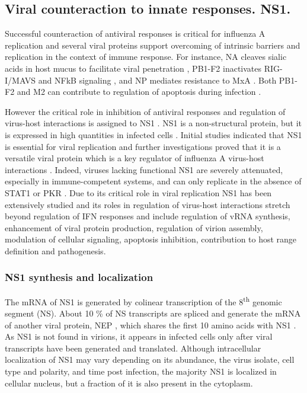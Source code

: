 		
	\subsection{Viral counteraction to innate responses. NS1.}
	
	Successful counteraction of antiviral responses is critical for influenza A replication and several viral proteins support overcoming of intrinsic barriers and replication in the context of immune response. For instance, \gls{NA} cleaves sialic acids in host mucus to facilitate viral penetration \parencite{Cohen2013}, \gls{PB1}-F2 inactivates \gls{RIG-I}/\gls{MAVS} and \gls{NFkB} signaling \parencite{Varga2011, Dudek2011, Reis2013}, and \gls{NP} mediates resistance to \gls{MxA} \parencite{Dittmann2008}. Both \gls{PB1}-F2 and \gls{M2} can contribute to regulation of apoptosis during infection \parencite{Herold2012}. 
	
	However the critical role in inhibition of antiviral responses and regulation of virus-host interactions is assigned to \gls{NS1} \parencite{Garcia-Sastre1998}. \gls{NS1} is a non-structural protein, but it is expressed in high quantities in infected cells \parencite{Ritchey1976}. Initial studies indicated that \gls{NS1} is essential for viral replication \parencite{Koennecke1981} and further investigations proved that it is a versatile viral protein which is a key regulator of influenza A virus-host interactions \parencite{Ayllon2015}. Indeed, viruses lacking functional \gls{NS1} are severely attenuated, especially in immune-competent systems, and can only replicate in the absence of \gls{STAT}1 or \gls{PKR} \parencite{Garcia-Sastre1998, Egorov1998, Donelan2003, Falcon2004}. Due to its critical role in viral replication \gls{NS1} has been extensively studied and its roles in regulation of virus-host interactions stretch beyond regulation of \gls{IFN} responses and include regulation of vRNA synthesis, enhancement of viral protein production, regulation of virion assembly, modulation of cellular signaling, apoptosis inhibition, contribution to host range definition and pathogenesis. 
		
		
		\subsubsection{NS1 synthesis and localization}
		
		The mRNA of \gls{NS1} is generated by colinear transcription of the 8\textsuperscript{th} genomic segment (NS). About 10 \% of NS transcripts are spliced and generate the mRNA of another viral protein, \gls{NEP} \parencite{Lamb1980}, which shares the first 10 amino acids with \gls{NS1} \parencite{Inglis1979, Lamb1979, Lamb1980}. As \gls{NS1} is not found in virions, it appears in infected cells only after viral transcripts have been generated and translated. Although intracellular localization of \gls{NS1} may vary depending on its abundance, the virus isolate, cell type and polarity, and time post infection, the majority \gls{NS1} is localized in cellular nucleus, but a fraction of it is also present in the cytoplasm\parencite{Melen2007, Melen2012, Newby2007, Li1998, Greenspan1988}. 
		
